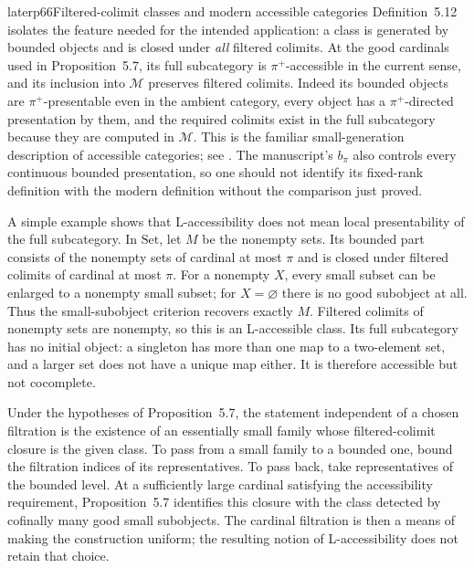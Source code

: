 \begin{dcomment}{later}{p66}{Filtered-colimit classes and modern accessible categories}
Definition~5.12 isolates the feature needed for the intended application: a class is generated by bounded objects and is closed under \emph{all} filtered colimits. At the good cardinals used in Proposition~5.7, its full subcategory is $\pi^+$-accessible in the current sense, and its inclusion into $\mathcal M$ preserves filtered colimits. Indeed its bounded objects are $\pi^+$-presentable even in the ambient category, every object has a $\pi^+$-directed presentation by them, and the required colimits exist in the full subcategory because they are computed in $\mathcal M$. This is the familiar small-generation description of accessible categories; see \citep[Definition~2.1 and Theorem~2.26]{AdamekRosicky1994}. The manuscript's $b_\pi$ also controls every continuous bounded presentation, so one should not identify its fixed-rank definition with the modern definition without the comparison just proved.

A simple example shows that L-accessibility does not mean local presentability of the full subcategory. In $\mathrm{Set}$, let $M$ be the nonempty sets. Its bounded part consists of the nonempty sets of cardinal at most $\pi$ and is closed under filtered colimits of cardinal at most $\pi$. For a nonempty $X$, every small subset can be enlarged to a nonempty small subset; for $X=\varnothing$ there is no good subobject at all. Thus the small-subobject criterion recovers exactly $M$. Filtered colimits of nonempty sets are nonempty, so this is an L-accessible class. Its full subcategory has no initial object: a singleton has more than one map to a two-element set, and a larger set does not have a unique map either. It is therefore accessible but not cocomplete.

Under the hypotheses of Proposition~5.7, the statement independent of a chosen filtration is the existence of an essentially small family whose filtered-colimit closure is the given class. To pass from a small family to a bounded one, bound the filtration indices of its representatives. To pass back, take representatives of the bounded level. At a sufficiently large cardinal satisfying the accessibility requirement, Proposition~5.7 identifies this closure with the class detected by cofinally many good small subobjects. The cardinal filtration is then a means of making the construction uniform; the resulting notion of L-accessibility does not retain that choice.


\end{dcomment}
